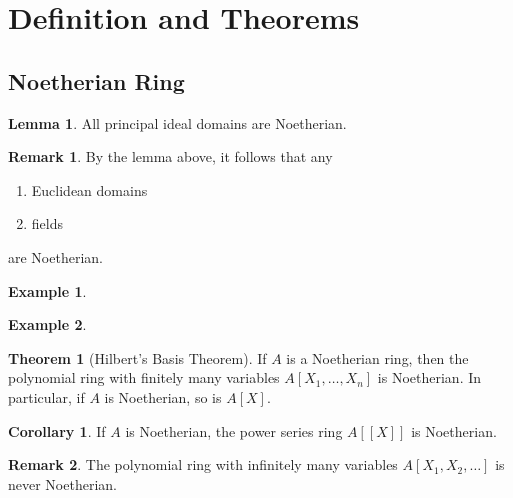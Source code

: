 \documentclass[a4paper]{book}
\theoremstyle{definition}
\newtheorem{example}{Example}[definition]
\newtheorem{theorem}[definition]{Theorem}
\newtheorem{corollary}{Corollary}
\newtheorem{lemma}[definition]{Lemma}
\newtheorem*{remark}{Remark}
\begin{document}
\section{Definition and Theorems}
\subsection{Noetherian Ring}

\begin{thmbox}
    \begin{lemma}
        All principal ideal domains are Noetherian.
    \end{lemma}
\end{thmbox}

\begin{rembox}
    \begin{remark}
        By the lemma above, it follows that any
        \begin{enumerate}
            \item Euclidean domains
            \item fields
        \end{enumerate}
        are Noetherian.
    \end{remark}
\end{rembox}

\begin{example}
    
\end{example}

\begin{example}
    
\end{example}

\begin{thmbox}
    \begin{theorem}[Hilbert's Basis Theorem]
        If \(A\) is a Noetherian ring, then the polynomial ring with finitely many variables \(A[X_1, \ldots, X_n]\) is Noetherian. In particular, if \(A\) is Noetherian, so is \(A[X]\).
    \end{theorem}
\end{thmbox}

\begin{thmbox}
    \begin{corollary}
        If \(A\) is Noetherian, the power series ring \(A[[X]]\) is Noetherian.
    \end{corollary}
\end{thmbox}

\begin{rembox}
    \begin{remark}
        The polynomial ring with infinitely many variables \(A[X_1, X_2, \ldots]\) is never Noetherian.
    \end{remark}
\end{rembox}
\end{document}
